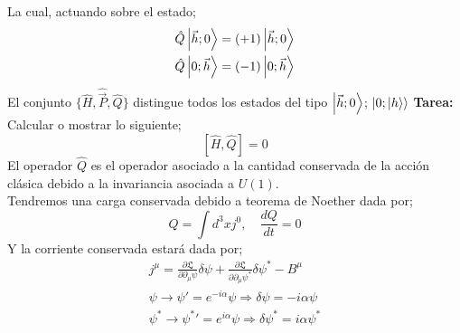\documentclass[../main.tex]{subfiles}
\begin{document}
 La cual, actuando sobre el estado;
 \begin{align*}
   \hat{Q}\ket{\vec{h};0} &  = (+1) \ket{\vec{h};0} \\
   \hat{Q}\ket{0;\vec{h}} & = (-1) \ket{0;\vec{h}}
 \end{align*}
 El conjunto $\{\hat{H}, \hat{\vec{P}}, \hat{Q} \}$ distingue todos los estados del tipo $\ket{\vec{h};0}$; $\ket{0;\ket{h}}$
 \textbf{Tarea:} Calcular o mostrar lo siguiente;
 \begin{equation}
   \left[ \hat{H} , \hat{Q} \right] = 0
  \end{equation}
  El operador $\hat{Q}$ es el operador asociado a la cantidad conservada de la acción clásica debido a la invariancia asociada a $U(1)$. \\
  Tendremos una carga conservada debido a teorema de Noether dada por;
  \begin{equation*}
    Q = \int d^3x j^0, \quad \frac{dQ}{dt} = 0
  \end{equation*}
  Y la corriente conservada estará dada por;
  \begin{align*}
    j^\mu = \frac{\partial \mathfrak{L}}{\partial \partial_\mu \psi} \delta \psi + \frac{\partial \mathfrak{L}}{\partial \partial_\mu \psi^*}\delta \psi^* - B^\mu \\
    \psi \longrightarrow \psi'= e^{-i\alpha}\psi \Rightarrow \delta \psi = -i\alpha \psi \\
    \psi^* \longrightarrow \psi^*' = e^{i\alpha}\psi \Rightarrow \delta \psi^* = i\alpha \psi^*
  \end{align*}
\end{document}
